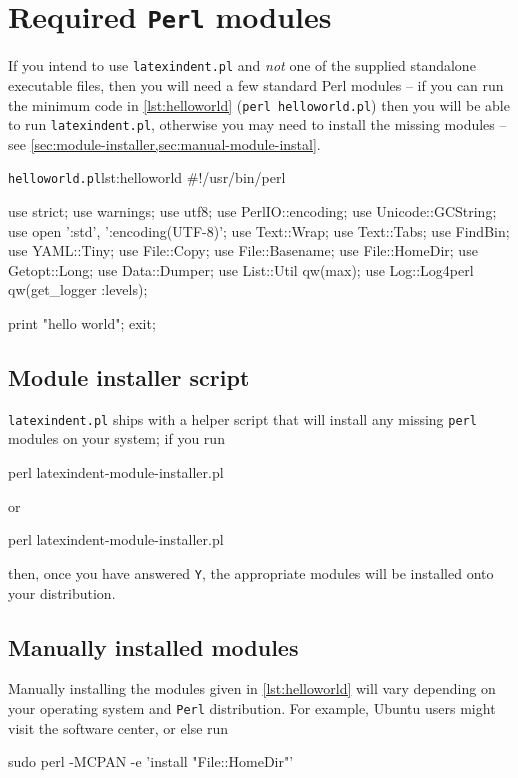 \appendix
	\section{Required \texttt{Perl} modules}
	 \label{sec:requiredmodules}
	 If you intend to use \texttt{latexindent.pl} and \emph{not} one of the supplied standalone executable files, then you will need a few standard Perl modules -- if you can run the minimum code in \cref{lst:helloworld} (\texttt{perl helloworld.pl}) then you will be able to run \texttt{latexindent.pl}, otherwise you may need to install the missing modules -- see \cref{sec:module-installer,sec:manual-module-instal}.

	 \begin{cmhlistings}[style=tcblatex,language=Perl]{\texttt{helloworld.pl}}{lst:helloworld}
#!/usr/bin/perl

use strict;
use warnings;
use utf8;
use PerlIO::encoding;
use Unicode::GCString;
use open ':std', ':encoding(UTF-8)';
use Text::Wrap;
use Text::Tabs;
use FindBin;
use YAML::Tiny;
use File::Copy;
use File::Basename;
use File::HomeDir;
use Getopt::Long;
use Data::Dumper;
use List::Util qw(max);
use Log::Log4perl qw(get_logger :levels);

print "hello world";
exit;
\end{cmhlistings}

	\subsection{Module installer script}
		\label{sec:module-installer}
		\texttt{latexindent.pl} ships with a helper script that will install any missing \texttt{perl} modules on your system; if you run \begin{commandshell}
perl latexindent-module-installer.pl
     \end{commandshell} or \begin{dosprompt}
perl latexindent-module-installer.pl
 \end{dosprompt} then, once you have answered \texttt{Y}, the appropriate modules will be installed onto your distribution.

	\subsection{Manually installed modules}
		\label{sec:manual-module-instal}
		Manually installing the modules given in \cref{lst:helloworld} will vary depending on your operating system and \texttt{Perl} distribution.
		For example, Ubuntu users might visit the software center, or else run \begin{commandshell}
sudo perl -MCPAN -e 'install "File::HomeDir"'
 \end{commandshell} 

